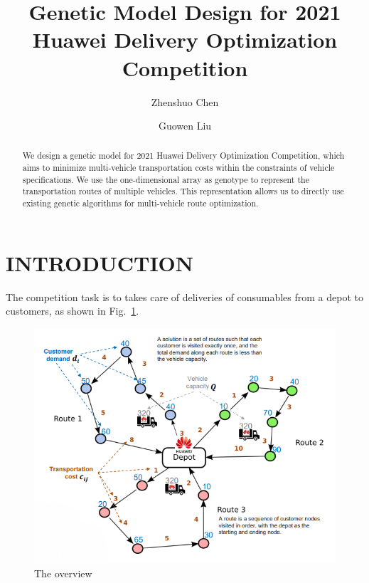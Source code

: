 \documentclass[runningheads]{llncs}
\begin{document}
\title{Genetic Model Design for 2021 Huawei Delivery Optimization Competition}

\author{Zhenshuo Chen \and
    Guowen Liu}


\maketitle


\begin{abstract}
We design a genetic model for 2021 Huawei Delivery Optimization Competition,
which aims to minimize multi-vehicle transportation costs within the constraints of vehicle specifications.
We use the one-dimensional array as genotype to represent the transportation routes of multiple vehicles.
This representation allows us to directly use existing genetic algorithms for multi-vehicle route optimization.

\end{abstract}


\section{INTRODUCTION}
The competition task is to takes care of deliveries of consumables from a depot to customers, as shown in Fig.~\ref{fig:overview}.

\begin{figure}[htbp]
    \centerline{\includegraphics[width=0.8\linewidth]{figures/overview.png}}
    \caption{The overview}
    \label{fig:overview}
\end{figure}
\end{document}
